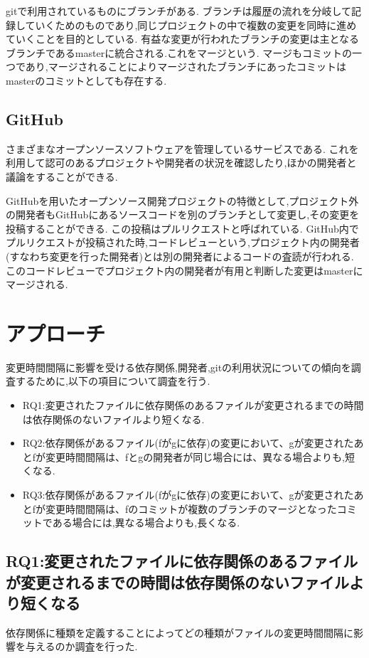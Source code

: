 \documentclass{fose2016}           %
\begin{document}
gitで利用されているものにブランチがある.
ブランチは履歴の流れを分岐して記録していくためのものであり,同じプロジェクトの中で複数の変更を同時に進めていくことを目的としている.
有益な変更が行われたブランチの変更は主となるブランチであるmasterに統合される.これをマージという.
マージもコミットの一つであり,マージされることによりマージされたブランチにあったコミットはmasterのコミットとしても存在する.

\subsection{GitHub}
さまざまなオープンソースソフトウェアを管理しているサービスである.
これを利用して認可のあるプロジェクトや開発者の状況を確認したり,ほかの開発者と議論をすることができる.

GitHubを用いたオープンソース開発プロジェクトの特徴として,プロジェクト外の開発者もGitHubにあるソースコードを別のブランチとして変更し,その変更を投稿することができる.
この投稿はプルリクエストと呼ばれている.
GitHub内でプルリクエストが投稿された時,コードレビューという,プロジェクト内の開発者(すなわち変更を行った開発者)とは別の開発者によるコードの査読が行われる.
このコードレビューでプロジェクト内の開発者が有用と判断した変更はmasterにマージされる.


\section{アプローチ}\label{アプローチ}
変更時間間隔に影響を受ける依存関係,開発者,gitの利用状況についての傾向を調査するために,以下の項目について調査を行う.
\begin{itemize}
\item RQ1:変更されたファイルに依存関係のあるファイルが変更されるまでの時間は依存関係のないファイルより短くなる.
\item RQ2:依存関係があるファイル(fがgに依存)の変更において、gが変更されたあとfが変更時間間隔は、fとgの開発者が同じ場合には、異なる場合よりも,短くなる.
\item RQ3:依存関係があるファイル(fがgに依存)の変更において、gが変更されたあとfが変更時間間隔は、fのコミットが複数のブランチのマージとなったコミットである場合には,異なる場合よりも,長くなる.
\end{itemize}
\subsection{RQ1:変更されたファイルに依存関係のあるファイルが変更されるまでの時間は依存関係のないファイルより短くなる}
依存関係に種類を定義することによってどの種類がファイルの変更時間間隔に影響を与えるのか調査を行った.
\end{document}
